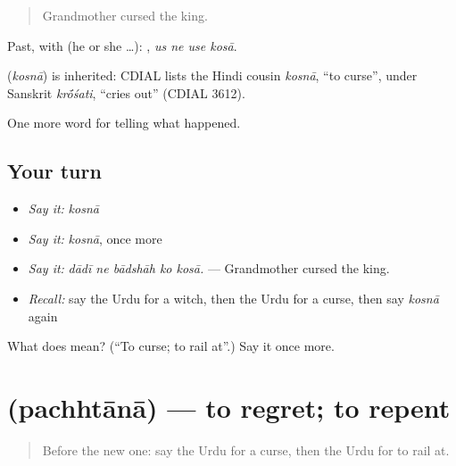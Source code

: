 \begin{quote}
Grandmother cursed the king.
\end{quote}

Past, with  (he or she …):    , \emph{us ne use kosā}.

\begin{cousinweb}
\textbf{} (\emph{kosnā}) is inherited: CDIAL lists the Hindi cousin \emph{kosnā}, \textquotedblleft{}to curse\textquotedblright{}, under Sanskrit \emph{kr\'{\={o}}śati}, \textquotedblleft{}cries out\textquotedblright{} (CDIAL 3612).
\end{cousinweb}

\begin{grammarlens}[title={What you've built}]
One more word for telling what happened.
\end{grammarlens}

\subsection*{Your turn}
\begin{itemize}
\raggedright
  \item \emph{Say it:} \emph{kosnā}
  \item \emph{Say it:} \emph{kosnā}, once more
  \item \emph{Say it:} \emph{dādī ne bādshāh ko kosā.} — Grandmother cursed the king.
  \item \emph{Recall:} say the Urdu for a witch, then the Urdu for a curse, then say \emph{kosnā} again
\end{itemize}

\begin{tcolorbox}[breakable,colback=teal!4,colframe=teal!35!black,title={Before you move on}]
What does  mean? (\textquotedblleft{}To curse; to rail at\textquotedblright{}.) Say it once more.
\end{tcolorbox}
\section[\texorpdfstring{\ur{پچھتانا} (pachhtānā)}{پچھتانا (pachhtānā)}]{ (pachhtānā) — to regret; to repent}

\label{lesson:UR-C326-pachhtana}



\begin{quote}
Before the new one: say the Urdu for a curse, then the Urdu for to rail at.
\end{quote}

